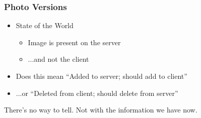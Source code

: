 \documentclass{beamer}
\begin{document}
\begin{frame}
\begin{columns}
\begin{column}{0.35\textwidth}
\begin{center}
\begin{figure}
        \end{figure}
      \end{center}
    \end{column}
  \end{columns}
\end{frame}

\begin{frame}
  \frametitle{Photo Versions}

  \begin{itemize}
    \pause
  \item State of the World
    \begin{itemize}
      \pause
    \item Image is present on the server
      \pause
    \item ...and not the client
    \end{itemize}
    \pause
  \item Does this mean ``Added to server; should add to client''
    \pause
  \item ...or ``Deleted from client; should delete from server''
  \end{itemize}
\end{frame}

\begin{frame}
  There's no way to tell.
  \pause
  Not with the information we have now.
\end{frame}
\end{document}
